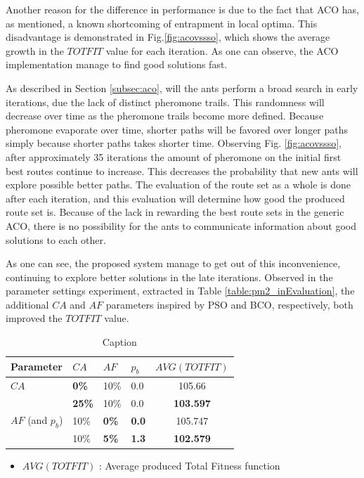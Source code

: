 Another reason for the difference in performance is due to the fact that ACO has, as mentioned, a known shortcoming of entrapment in local optima. This disadvantage is demonstrated in Fig.\ref{fig:acovssso}, which shows the average growth in the $TOTFIT$ value for each iteration. As one can observe, the ACO implementation manage to find good solutions fast. 


As described in Section \vref{subsec:aco}, will the ants perform a broad search in early iterations, due the lack of distinct pheromone trails. This randomness will decrease over time as the pheromone trails become more defined. Because pheromone evaporate over time, shorter paths will be favored over longer paths simply because shorter paths takes shorter time. Observing Fig. \ref{fig:acovssso}, after approximately 35 iterations the amount of pheromone on the initial first best routes continue to increase. This decreases the probability that new ants will explore possible better paths. The evaluation of the route set as a whole is done after each iteration, and this evaluation will determine how good the produced route set is. Because of the lack in rewarding the best route sets in the generic ACO, there is no possibility for the ants to communicate information about good solutions to each other.

As one can see, the proposed system manage to get out of this inconvenience, continuing to explore better solutions in the late iterations. Observed in the parameter settings experiment, extracted in Table \vref{table:pm2_inEvaluation}, the additional $CA$ and $AF$ parameters inspired by PSO and BCO, respectively, both improved the $TOTFIT$ value. 

\begin{table}
    \centering
    \begin{tabular}{|l|l|l|l||c|}
    \hline
    Parameter & $CA$ & $AF$ & $p_b$ & $AVG(TOTFIT)$ \\
    \hline
    $CA$ & \textbf{0\%} & 10\% & 0.0 & 105.66\\
    ~ & \textbf{25\%} & 10\% & 0.0 & \textbf{103.597}\\
    \hline
    $AF$ (and $p_b$) & 10\% & \textbf{0\%} & \textbf{0.0} & 105.747 \\
    ~ & 10\% & \textbf{5\%} & \textbf{1.3} & \textbf{102.579}\\
    \hline
    \end{tabular}
    \caption {Caption}
    \tiny
    \begin{itemize}[noitemsep]
    \item[ ] $AVG(TOTFIT)$ : Average produced Total Fitness function
    \end{itemize}
    \label{table:pm2_inEvaluation}
\end{table}


